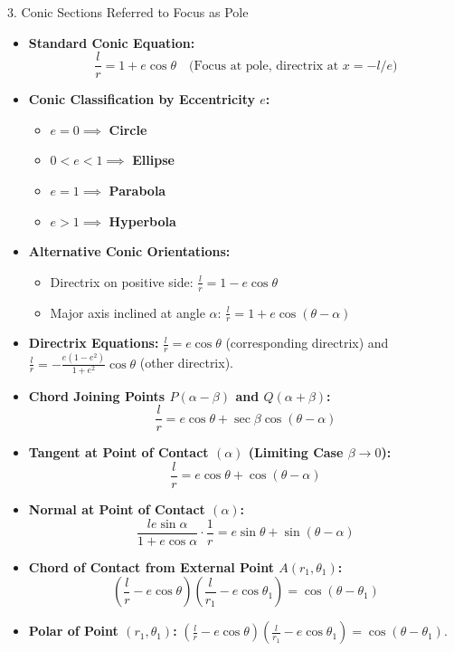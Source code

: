 \documentclass[11pt,a4paper]{article}
\begin{document}
\newpage

\begin{exbox}{3. Conic Sections Referred to Focus as Pole}
\begin{itemize}
    \item \textbf{Standard Conic Equation:}
    \begin{equation*}
        \frac{l}{r} = 1 + e\cos\theta \quad \text{(Focus at pole, directrix at $x = -l/e$)}
    \end{equation*}
    \item \textbf{Conic Classification by Eccentricity $e$:}
    \begin{itemize}
        \item $e = 0 \implies$ \textbf{Circle}
        \item $0 < e < 1 \implies$ \textbf{Ellipse}
        \item $e = 1 \implies$ \textbf{Parabola}
        \item $e > 1 \implies$ \textbf{Hyperbola}
    \end{itemize}
    \item \textbf{Alternative Conic Orientations:}
    \begin{itemize}
        \item Directrix on positive side: $\frac{l}{r} = 1 - e\cos\theta$
        \item Major axis inclined at angle $\alpha$: $\frac{l}{r} = 1 + e\cos(\theta - \alpha)$
    \end{itemize}
    \item \textbf{Directrix Equations:} $\frac{l}{r} = e\cos\theta$ (corresponding directrix) and $\frac{l}{r} = -\frac{e(1-e^2)}{1+e^2}\cos\theta$ (other directrix).
    \item \textbf{Chord Joining Points $P(\alpha - \beta)$ and $Q(\alpha + \beta)$:}
    \begin{equation*}
        \frac{l}{r} = e\cos\theta + \sec\beta\cos(\theta - \alpha)
    \end{equation*}
    \item \textbf{Tangent at Point of Contact $(\alpha)$ (Limiting Case $\beta \to 0$):}
    \begin{equation*}
        \frac{l}{r} = e\cos\theta + \cos(\theta - \alpha)
    \end{equation*}
    \item \textbf{Normal at Point of Contact $(\alpha)$:}
    \begin{equation*}
        \frac{le\sin\alpha}{1 + e\cos\alpha} \cdot \frac{1}{r} = e\sin\theta + \sin(\theta - \alpha)
    \end{equation*}
    \item \textbf{Chord of Contact from External Point $A(r_1, \theta_1)$:}
    \begin{equation*}
        \left(\frac{l}{r} - e\cos\theta\right)\left(\frac{l}{r_1} - e\cos\theta_1\right) = \cos(\theta - \theta_1)
    \end{equation*}
    \item \textbf{Polar of Point $(r_1, \theta_1)$:} $\left(\frac{l}{r} - e\cos\theta\right)\left(\frac{l}{r_1} - e\cos\theta_1\right) = \cos(\theta - \theta_1)$.
\end{itemize}
\end{exbox}
\end{document}
